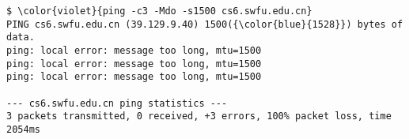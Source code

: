 \documentclass[varwidth=39.5em,crop]{standalone}
\begin{document}
\pagestyle{empty}

\begin{Verbatim}[commandchars=\\\{\}]
$ \color{violet}{ping -c3 -Mdo -s1500 cs6.swfu.edu.cn}
PING cs6.swfu.edu.cn (39.129.9.40) 1500({\color{blue}{1528}}) bytes of data.
ping: local error: message too long, mtu=1500
ping: local error: message too long, mtu=1500
ping: local error: message too long, mtu=1500

--- cs6.swfu.edu.cn ping statistics ---
3 packets transmitted, 0 received, +3 errors, 100% packet loss, time 2054ms
\end{Verbatim}
\end{document}
